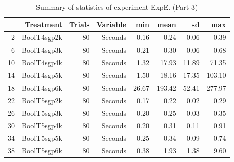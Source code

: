 \begin{table}[ht]
\centering
\begin{tabular}{rrrrrrrr}
  \hline
 & Treatment & Trials & Variable & min & mean & sd & max \\ 
  \hline
2 & BoolT4sgp2k &  80 & Seconds & 0.16 & 0.24 & 0.06 & 0.39 \\ 
  6 & BoolT4sgp3k &  80 & Seconds & 0.21 & 0.30 & 0.06 & 0.68 \\ 
  10 & BoolT4sgp4k &  80 & Seconds & 1.32 & 17.93 & 11.89 & 71.35 \\ 
  14 & BoolT4sgp5k &  80 & Seconds & 1.50 & 18.16 & 17.35 & 103.10 \\ 
  18 & BoolT4sgp6k &  80 & Seconds & 26.67 & 193.42 & 52.41 & 277.97 \\ 
  22 & BoolT5sgp2k &  80 & Seconds & 0.17 & 0.22 & 0.02 & 0.29 \\ 
  26 & BoolT5sgp3k &  80 & Seconds & 0.20 & 0.25 & 0.03 & 0.35 \\ 
  30 & BoolT5sgp4k &  80 & Seconds & 0.20 & 0.31 & 0.11 & 0.91 \\ 
  34 & BoolT5sgp5k &  80 & Seconds & 0.25 & 0.34 & 0.09 & 0.74 \\ 
  38 & BoolT5sgp6k &  80 & Seconds & 0.38 & 1.93 & 1.38 & 9.60 \\ 
   \hline
\end{tabular}
\caption{Summary of statistics of experiment ExpE. (Part 3)} 
\end{table}
